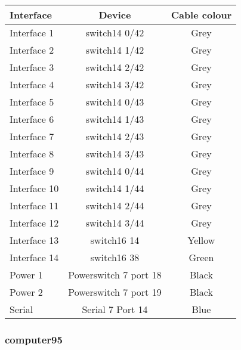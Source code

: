 \begin{table}[H]
\begin{tabular}{|l|c|c|}\hline
Interface & Device & Cable colour \\ \hline
Interface 1 & switch14 0/42 & Grey \\
Interface 2 & switch14 1/42 & Grey \\
Interface 3 & switch14 2/42 & Grey \\
Interface 4 & switch14 3/42 & Grey \\
Interface 5 & switch14 0/43 & Grey \\
Interface 6 & switch14 1/43 & Grey \\
Interface 7 & switch14 2/43 & Grey \\
Interface 8 & switch14 3/43 & Grey \\
Interface 9 & switch14 0/44 & Grey \\
Interface 10 & switch14 1/44 & Grey \\
Interface 11 & switch14 2/44 & Grey \\
Interface 12 & switch14 3/44 & Grey \\
Interface 13 & switch16 14 & Yellow \\
Interface 14 & switch16 38 & Green \\
Power 1 & Powerswitch 7 port 18 & Black \\
Power 2 & Powerswitch 7 port 19 & Black \\
Serial & Serial 7 Port 14 & Blue \\ \hline
\end{tabular}
\end{table}


\subsubsection{computer95}

